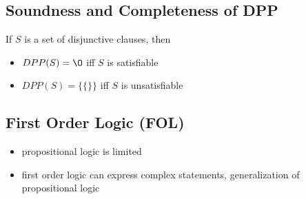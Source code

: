 \documentclass[11pt]{article}
\begin{document}
\subsection*{Soundness and Completeness of DPP}
If $S$ is a set of disjunctive clauses, then 
\begin{itemize}
    \item $DPP(S)=\O$ iff $S$ is satisfiable
    \item $DPP(S)=\{\{\}\}$ iff $S$ is unsatisfiable
\end{itemize}
\subsection{First Order Logic (FOL)}
\begin{itemize}
    \item propositional logic is limited
    \item first order logic can express complex statements, generalization of propositional logic 
\end{itemize}
\end{document}
